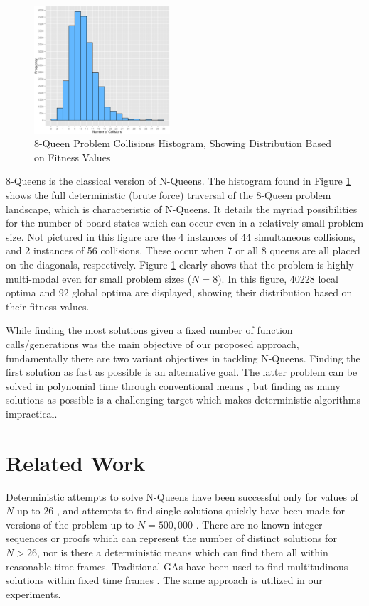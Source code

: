 \documentclass[conference]{IEEEtran}
\begin{document}
\begin{figure}[h!]
\centerline{\includegraphics[width=0.45\textwidth]{figures/8_queens_histogram.png}}
\caption{8-Queen Problem Collisions Histogram, Showing Distribution Based on Fitness Values}
\label{fig:histogram}
\end{figure}

8-Queens is the classical version of N-Queens. The histogram found in Figure \ref{fig:histogram} shows the full deterministic (brute force) traversal of the 8-Queen problem landscape, which is characteristic of N-Queens. It details the myriad possibilities for the number of board states which can occur even in a relatively small problem size. Not pictured in this figure are the 4 instances of 44 simultaneous collisions, and 2 instances of 56 collisions. These occur when 7 or all 8 queens are all placed on the diagonals, respectively. Figure \ref{fig:histogram} clearly shows that the problem is highly multi-modal even for small problem sizes ($N = 8$). In this figure, 40228 local optima and 92 global optima are displayed, showing their distribution based on their fitness values.

While finding the most solutions given a fixed number of function calls/generations was the main objective of our proposed approach, fundamentally there are two variant objectives in tackling N-Queens. Finding the first solution as fast as possible is an alternative goal. The latter problem can be solved in polynomial time through conventional means \cite{cit:22,cit:23}, but finding as many solutions as possible is a challenging target which makes deterministic algorithms impractical.

\section{Related Work}
Deterministic attempts to solve N-Queens have been successful only for values of $N$ up to 26 \cite{cit:20,cit:24}, and attempts to find single solutions quickly have been made for versions of the problem up to {$N = 500,000$} \cite{cit:21}. There are no known integer sequences or proofs which can represent the number of distinct solutions for $N > 26$, nor is there a deterministic means which can find them all within reasonable time frames. Traditional GAs have been used to find multitudinous solutions within fixed time frames \cite{cit:9,cit:10}. The same approach is utilized in our experiments.
\end{document}
